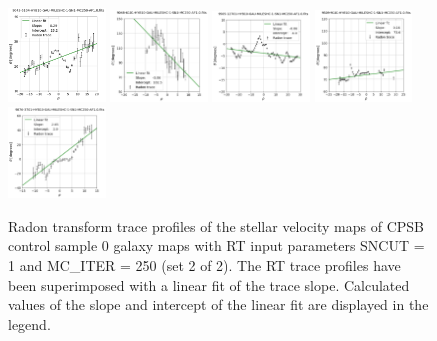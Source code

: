 \documentclass[fleqn,usenatbib]{mnras}
\begin{document}
\begin{figure}
    \includegraphics[width=0.23\textwidth]{Images/LINFITS/CC0-9043-6104-LINFIT-EBARS-MASKED.png}
    \includegraphics[width=0.23\textwidth]{Images/LINFITS/CC0-9048-6101-LINFIT-EBARS-MASKED.png}
    \includegraphics[width=0.23\textwidth]{Images/LINFITS/CC0-9505-12701-LINFIT-EBARS-MASKED.png}
    \includegraphics[width=0.23\textwidth]{Images/LINFITS/CC0-9505-9101-LINFIT-EBARS-MASKED.png}
    \includegraphics[width=0.23\textwidth]{Images/LINFITS/CC0-9876-3701-LINFIT-EBARS-MASKED.png}
    \caption{Radon transform trace profiles of the stellar velocity maps of CPSB control sample 0 galaxy maps with RT input parameters SNCUT = 1 and MC\_ITER = 250 (set 2 of 2). The RT trace profiles have been superimposed with a linear fit of the trace slope. Calculated values of the slope and intercept of the linear fit are displayed in the legend.}
    \label{fig:Radon-traces-CC0-LINFITS-2}
\end{figure}
\end{document}
